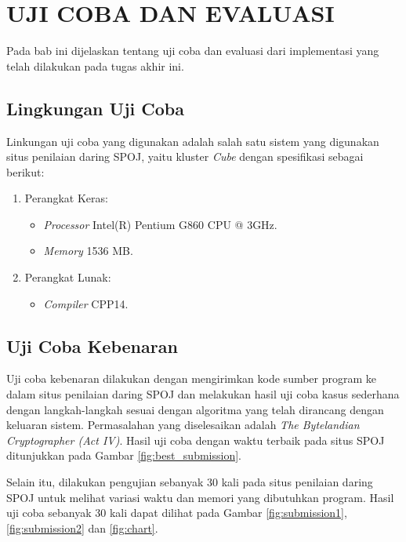 \chapter{UJI COBA DAN EVALUASI}

Pada bab ini dijelaskan tentang uji coba dan evaluasi dari implementasi yang telah dilakukan pada tugas akhir ini.

\section{Lingkungan Uji Coba}

Linkungan uji coba yang digunakan adalah salah satu sistem yang digunakan situs penilaian daring SPOJ, yaitu kluster \textit{Cube} dengan spesifikasi sebagai berikut:

\begin{enumerate}
	\item Perangkat Keras:
	\begin{itemize}
		\item \textit{Processor} Intel(R) Pentium G860 CPU @ 3GHz.
		\item \textit{Memory} 1536 MB.
	\end{itemize}
	\item Perangkat Lunak:
	\begin{itemize}
		\item \textit{Compiler} CPP14.
	\end{itemize}			
\end{enumerate} 

\section{Uji Coba Kebenaran}

Uji coba kebenaran dilakukan dengan mengirimkan kode sumber program ke dalam situs penilaian daring SPOJ dan melakukan hasil uji coba kasus sederhana dengan langkah-langkah sesuai dengan algoritma yang telah dirancang dengan keluaran sistem. Permasalahan yang diselesaikan adalah \textit{The Bytelandian Cryptographer (Act IV)}. Hasil uji coba dengan waktu terbaik pada situs SPOJ ditunjukkan pada Gambar \ref{fig:best_submission}.

Selain itu, dilakukan pengujian sebanyak 30 kali pada situs penilaian daring SPOJ untuk melihat variasi waktu dan memori  yang dibutuhkan program. Hasil uji coba sebanyak 30 kali dapat dilihat pada Gambar \ref{fig:submission1}, \ref{fig:submission2} dan \ref{fig:chart}.

